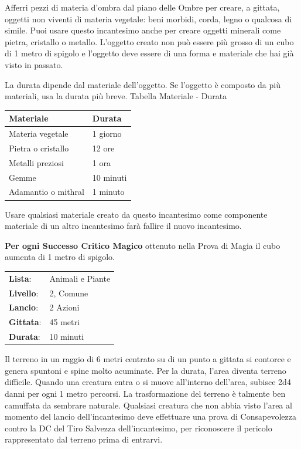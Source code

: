 \begin{multicols}{2}
Afferri pezzi di materia d'ombra dal piano delle Ombre per creare, a gittata, oggetti non viventi di materia vegetale: beni morbidi, corda, legno o qualcosa di simile. Puoi usare questo incantesimo anche per creare oggetti minerali come pietra, cristallo o metallo. L'oggetto creato non può essere più grosso di un cubo di 1 metro di spigolo e l'oggetto deve essere di una forma e materiale che hai già visto in passato.

La durata dipende dal materiale dell'oggetto. Se l'oggetto è composto da più materiali, usa la durata più breve.
\medskip
Tabella Materiale - Durata
\medskip

\noindent\begin{tabularx}{\linewidth}{lX}
	\toprule
	\textbf{Materiale} & \textbf{Durata}\\
	\toprule
 \rowcolor{gray!20}Materia vegetale &1 giorno\\
	Pietra o cristallo &12 ore\\
 \rowcolor{gray!20}Metalli preziosi &1 ora\\
	Gemme &10 minuti\\
 \rowcolor{gray!20}Adamantio o mithral &1 minuto
\end{tabularx}
\medskip

Usare qualsiasi materiale creato da questo incantesimo come componente materiale di un altro incantesimo farà fallire il nuovo incantesimo.

\textbf{Per ogni Successo Critico Magico} ottenuto nella Prova di Magia il cubo aumenta di 1 metro di spigolo.

\noindent\begin{tabularx}{\linewidth}{p{1.3cm}X}
	\rowcolor{gray!20}\textbf{Lista}: & Animali e Piante \\
	\textbf{Livello}: & 2, Comune \\
	\rowcolor{gray!20}\textbf{Lancio}: & 2 Azioni \\
	\textbf{Gittata}: & 45 metri \\
	\rowcolor{gray!20}\textbf{Durata}: & 10 minuti \\
\end{tabularx}\smallskip

Il terreno in un raggio di 6 metri centrato su di un punto a gittata si contorce e genera spuntoni e spine molto acuminate. Per la durata, l'area diventa terreno difficile. Quando una creatura entra o si muove all'interno dell'area, subisce 2d4 danni per ogni 1 metro percorsi.
La trasformazione del terreno è talmente ben camuffata da sembrare naturale. Qualsiasi creatura che non abbia visto l'area al momento del lancio dell'incantesimo deve effettuare una prova di Consapevolezza contro la DC del Tiro Salvezza dell'incantesimo, per riconoscere il pericolo rappresentato dal terreno prima di entrarvi.


\end{multicols}
